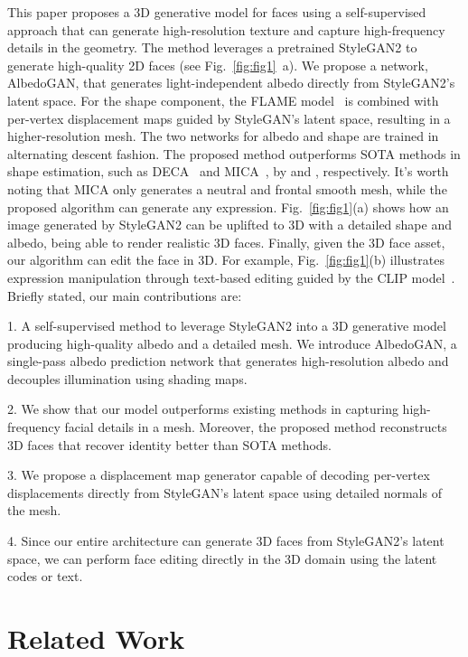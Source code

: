 \documentclass[10pt,twocolumn,letterpaper]{article}
\begin{document}
This paper proposes a 3D generative model for faces using a self-supervised approach that can generate high-resolution texture and capture high-frequency details in the geometry. The method leverages a pretrained StyleGAN2 to generate high-quality 2D faces (see Fig.~\ref{fig:fig1}~a). 
We propose a network, AlbedoGAN, that  generates light-independent albedo directly from StyleGAN2’s latent space. For the shape component, the FLAME model~\cite{flame} is combined with per-vertex displacement maps guided by StyleGAN's latent space, resulting in a higher-resolution mesh. The two networks for albedo and shape are trained in alternating descent fashion. The proposed method outperforms SOTA methods in shape estimation, such as DECA~\cite{deca} and MICA~\cite{MICA:ECCV2022}, by  and , respectively. It's worth noting that MICA only generates a neutral and frontal smooth mesh, while the proposed algorithm can generate any expression. Fig.~\ref{fig:fig1}(a) shows how an image generated by StyleGAN2 can be uplifted to 3D with a detailed shape and albedo, being able to render realistic 3D faces.  Finally, given the 3D face asset, our algorithm can edit the face in 3D. For example, Fig.~\ref{fig:fig1}(b) illustrates expression manipulation through text-based editing guided by the CLIP model~\cite{radford2021learning}. Briefly stated, our main contributions are:



1. A self-supervised method to leverage StyleGAN2 into a 3D generative model producing high-quality albedo and a detailed mesh.  We introduce AlbedoGAN, a single-pass albedo prediction network that generates high-resolution albedo and decouples illumination using shading maps. 

2. We show that our model outperforms existing methods in capturing high-frequency facial details in a mesh.  Moreover, the proposed method reconstructs 3D faces that recover identity better than SOTA methods. 

3. We propose a displacement map generator capable of decoding per-vertex displacements directly from StyleGAN's latent space using detailed normals of the mesh.

4. Since our entire architecture can generate 3D faces from StyleGAN2’s latent space, we can perform face editing directly in the 3D domain using the latent codes or text. 



\vspace{-2mm}
\section{Related Work}
\vspace{-1mm}
\end{document}
